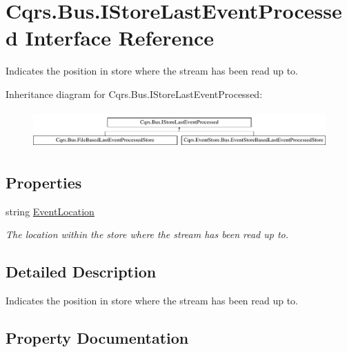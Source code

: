 \hypertarget{interfaceCqrs_1_1Bus_1_1IStoreLastEventProcessed}{}\section{Cqrs.\+Bus.\+I\+Store\+Last\+Event\+Processed Interface Reference}
\label{interfaceCqrs_1_1Bus_1_1IStoreLastEventProcessed}


Indicates the position in store where the stream has been read up to.  


Inheritance diagram for Cqrs.\+Bus.\+I\+Store\+Last\+Event\+Processed\+:\begin{figure}[H]
\begin{center}
\leavevmode
\includegraphics[height=1.462141cm]{interfaceCqrs_1_1Bus_1_1IStoreLastEventProcessed}
\end{center}
\end{figure}
\subsection*{Properties}
\begin{DoxyCompactItemize}
\item 
string \hyperlink{interfaceCqrs_1_1Bus_1_1IStoreLastEventProcessed_a4273c4f0bd5703d5eec2c0625436ed69_a4273c4f0bd5703d5eec2c0625436ed69}{Event\+Location}
\begin{DoxyCompactList}\small\item\em The location within the store where the stream has been read up to. \end{DoxyCompactList}\end{DoxyCompactItemize}


\subsection{Detailed Description}
Indicates the position in store where the stream has been read up to. 



\subsection{Property Documentation}
\mbox{\label{interfaceCqrs_1_1Bus_1_1IStoreLastEventProcessed_a4273c4f0bd5703d5eec2c0625436ed69_a4273c4f0bd5703d5eec2c0625436ed69}} 
